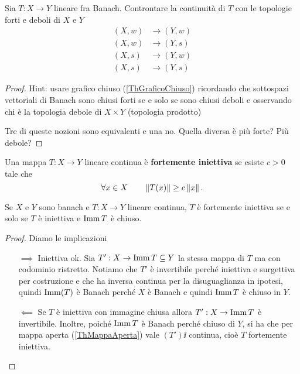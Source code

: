 \begin{exercise}
Sia $T:X\to Y$ lineare fra Banach. Controntare la continuit\`a di $T$ con le topologie forti e deboli di $X$ e $Y$
\begin{align*}
(X,w)&\to (Y,w)\\
(X,w)&\to (Y,s)\\
(X,s)&\to (Y,w)\\
(X,s)&\to (Y,s)
\end{align*}
\end{exercise}
\begin{proof}
Hint: usare grafico chiuso (\ref{ThGraficoChiuso}) ricordando che sottospazi vettoriali di Banach sono chiusi forti se e solo se sono chiusi deboli e osservando chi \`e la topologia debole di $X\times Y$ (topologia prodotto)

Tre di queste nozioni sono equivalenti e una no. Quella diversa \`e pi\`u forte? Pi\`u debole?
\end{proof}


\begin{definition}
Una mappa $T:X\to Y$ lineare continua \`e \textbf{fortemente iniettiva} se esiste $c>0$ tale che 
\[\forall x\in X\qquad \left\Vert{T(x)}\right\Vert\geq c\left\Vert{x}\right\Vert.\]
\end{definition}

\begin{proposition}
Se $X$ e $Y$ sono banach e $T:X\to Y$ lineare continua, $T$ \`e fortemente iniettiva se e solo se $T$ \`e iniettiva e $\operatorname{Imm} T$ \`e chiuso.
\end{proposition}
\begin{proof}
Diamo le implicazioni
\setlength{\leftmargini}{0cm}
\begin{itemize}
\item[$\boxed{\implies}$] Iniettiva ok. Sia $T':X\to \operatorname{Imm} T\subseteq Y$ la stessa mappa di $T$ ma con codominio ristretto. Notiamo che $T'$ \`e invertibile perch\'e iniettiva e surgettiva per costruzione e che ha inversa continua per la disuguaglianza in ipotesi, quindi $\operatorname{Imm}(T)$ \`e Banach perch\'e $X$ \`e Banach e quindi $\operatorname{Imm} T$ \`e chiuso in $Y$.
\item[$\boxed{\impliedby}$] Se $T$ \`e iniettiva con immagine chiusa allora $T':X\to \operatorname{Imm} T$ \`e invertibile. Inoltre, poich\'e $\operatorname{Imm} T$ \`e Banach perch\'e chiuso di $Y$, si ha che per mappa aperta (\ref{ThMappaAperta}) vale $(T')\ii$ continua, cio\`e $T$ fortemente iniettiva.
\end{itemize}
\setlength{\leftmargini}{0.5cm}
\end{proof}

